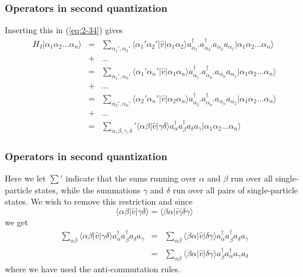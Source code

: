 \documentclass{beamer}
\begin{document}
\begin{frame}
\frametitle{Operators in second quantization}

\begin{block}{}
Inserting this in (\ref{eq:2-34}) gives
\begin{eqnarray}
	H_I |\alpha_1\alpha_2\dots\alpha_n\rangle
	&=& \sum_{\alpha_1', \alpha_2'} \langle \alpha_1'\alpha_2'|\hat{v}|\alpha_1\alpha_2\rangle
		a_{\alpha_1'}^{\dagger} a_{\alpha_2'}^{\dagger} a_{\alpha_2} a_{\alpha_1}
		|\alpha_1\alpha_2\dots\alpha_n\rangle \nonumber \\
	&+& \dots \nonumber \\
	&=& \sum_{\alpha_1', \alpha_n'} \langle \alpha_1'\alpha_n'|\hat{v}|\alpha_1\alpha_n\rangle
		a_{\alpha_1'}^{\dagger} a_{\alpha_n'}^{\dagger} a_{\alpha_n} a_{\alpha_1}
		|\alpha_1\alpha_2\dots\alpha_n\rangle \nonumber \\
	&+& \dots \nonumber \\
	&=& \sum_{\alpha_2', \alpha_n'} \langle \alpha_2'\alpha_n'|\hat{v}|\alpha_2\alpha_n\rangle
		a_{\alpha_2'}^{\dagger} a_{\alpha_n'}^{\dagger} a_{\alpha_n} a_{\alpha_2}
		|\alpha_1\alpha_2\dots\alpha_n\rangle \nonumber \\
	&+& \dots \nonumber \\
	&=& \sum_{\alpha, \beta, \gamma, \delta} ' \langle \alpha\beta|\hat{v}|\gamma\delta\rangle
		a^{\dagger}_\alpha a^{\dagger}_\beta a_\delta a_\gamma
		|\alpha_1\alpha_2\dots\alpha_n\rangle \label{eq:2-36}
\end{eqnarray}
\end{block}
\end{frame}

\begin{frame}
\frametitle{Operators in second quantization}

\begin{block}{}
Here we let $\sum'$ indicate that the sums running over $\alpha$ and $\beta$ run over all
single-particle states, while the summations  $\gamma$ and $\delta$ 
run over all pairs of single-particle states. We wish to remove this restriction and since
\begin{equation}
	\langle \alpha\beta|\hat{v}|\gamma\delta\rangle = \langle \beta\alpha|\hat{v}|\delta\gamma\rangle \label{eq:2-37}
\end{equation}
we get
\begin{eqnarray}
	\sum_{\alpha\beta} \langle \alpha\beta|\hat{v}|\gamma\delta\rangle a^{\dagger}_\alpha a^{\dagger}_\beta a_\delta a_\gamma &=& 
		\sum_{\alpha\beta} \langle \beta\alpha|\hat{v}|\delta\gamma\rangle 
		a^{\dagger}_\alpha a^{\dagger}_\beta a_\delta a_\gamma \label{eq:2-38a} \\
	&=& \sum_{\alpha\beta}\langle \beta\alpha|\hat{v}|\delta\gamma\rangle
		a^{\dagger}_\beta a^{\dagger}_\alpha a_\gamma a_\delta \label{eq:2-38b}
\end{eqnarray}
where we  have used the anti-commutation rules.
\end{block}
\end{frame}
\end{document}
